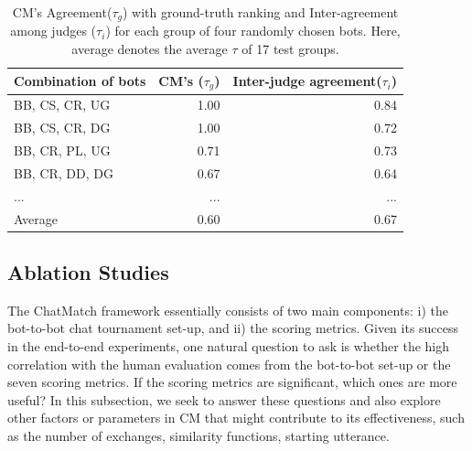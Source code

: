 \begin{table}[ht!]
\centering
\scriptsize
\begin{tabular}{lrr}
\toprule
Combination of bots & CM's ($\tau_{g}$) & Inter-judge agreement($\tau_{i}$) \\ \midrule
BB, CS, CR, UG & 1.00 &0.84   \\
BB, CS, CR, DG & 1.00 &0.72   \\
BB, CR, PL, UG & 0.71 &0.73     \\
BB, CR, DD, DG & 0.67 & 0.64 \\
... & ... & ...\\  \midrule
Average & 0.60 & 0.67 \\
\bottomrule
\end{tabular}
\caption{CM's Agreement($\tau_{g}$) with ground-truth ranking
and Inter-agreement among judges ($\tau_{i}$) for 
each group of four randomly chosen bots.
Here, average denotes the average $\tau$ of 17 test groups.} 
\label{tab:four}
\end{table}



\subsection{Ablation Studies}
\label{sec:ablation}
The ChatMatch framework essentially consists of two main components: i) the 
bot-to-bot chat tournament set-up, and ii) the scoring metrics. 
Given its success in the end-to-end experiments,
one natural question to ask is whether the high correlation with the human
evaluation comes from the bot-to-bot set-up or the seven scoring metrics.
If the scoring metrics are significant, which ones are more useful?
In this subsection, we seek to answer these questions 
and also explore other factors or parameters in
CM that might contribute to its effectiveness, 
such as the number of exchanges, similarity functions, 
starting utterance.


